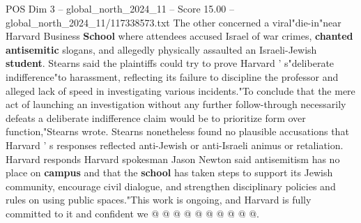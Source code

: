 \begin{textsample}{POS Dim 3 – global\_north\_2024\_11 – Score 15.00 – global\_north\_2024\_11/117338573.txt}
The other concerned a viral"die-in"near Harvard Business \textbf{School} where attendees accused Israel of war crimes, \textbf{chanted} \textbf{antisemitic} slogans, and allegedly physically assaulted an Israeli-Jewish \textbf{student}.
Stearns said the plaintiffs could try to prove Harvard ' s"deliberate indifference"to harassment, reflecting its failure to discipline the professor and alleged lack of speed in investigating various incidents."To conclude that the mere act of launching an investigation without any further follow-through necessarily defeats a deliberate indifference claim would be to prioritize form over function,"Stearns wrote.
Stearns nonetheless found no plausible accusations that Harvard ' s responses reflected anti-Jewish or anti-Israeli animus or retaliation.
Harvard responds Harvard spokesman Jason Newton said antisemitism has no place on \textbf{campus} and that the \textbf{school} has taken steps to support its Jewish community, encourage civil dialogue, and strengthen disciplinary policies and rules on using public spaces."This work is ongoing, and Harvard is fully committed to it and confident we @ @ @ @ @ @ @ @ @ @.

\end{textsample}
